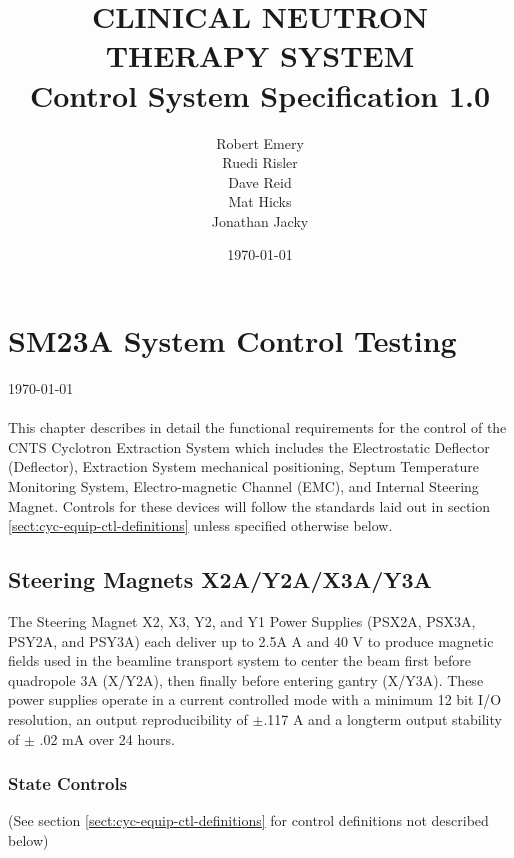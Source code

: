 \documentclass[11pt]{book}		%
\title{CLINICAL NEUTRON THERAPY SYSTEM\\
	Control System Specification 1.0\\[1.0cm]}
\author{Robert Emery\\
	Ruedi Risler\\
	Dave Reid \\
	Mat Hicks \\
        Jonathan Jacky}
\date{\today}
\begin{document}
\chapter{SM23A System Control Testing} \label{ch:cyc-equip-ctl-beamline}

\vspace*{-.75in}
\today \\
\vspace*{.75in}
\\

This chapter describes in detail the functional requirements for the control of the CNTS Cyclotron Extraction System which includes the Electrostatic Deflector (Deflector), Extraction System mechanical positioning, Septum Temperature Monitoring System, Electro-magnetic Channel (EMC), and Internal Steering Magnet.  Controls for these devices will follow the standards laid out in section \ref{sect:cyc-equip-ctl-definitions} unless specified otherwise below.

\section{Steering Magnets X2A/Y2A/X3A/Y3A} \label{sect:cyc-equip-ctl-beamline-sm23a}

The Steering Magnet X2, X3, Y2, and Y1 Power Supplies (PSX2A, PSX3A, PSY2A, and PSY3A) each deliver up to 2.5A A and 40 V to produce magnetic fields used in the beamline transport system to center the beam first before quadropole 3A (X/Y2A), then finally before entering gantry (X/Y3A).  These power supplies operate in a current controlled mode with a minimum 12 bit I/O resolution, an output reproducibility of $\pm$.117 A and a longterm output stability of $\pm$ .02 mA over 24 hours.

\subsection{State Controls} \label{sect:cyc-equip-ctl-beamline-sm23a-state-controls}
(See section \ref{sect:cyc-equip-ctl-definitions} for control definitions not described below)
\end{document}
